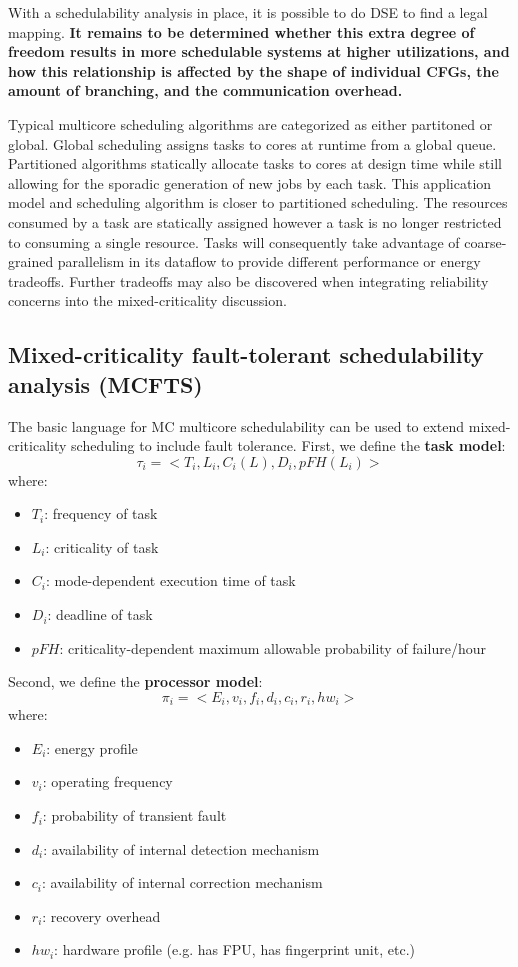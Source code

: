 \documentclass[table,11pt]{article}
\begin{document}
With a schedulability analysis in place, it is possible to do DSE to find a legal mapping. \textbf{It remains to be determined whether this extra degree of freedom results in more schedulable systems at higher utilizations, and how this relationship is affected by the shape of individual CFGs, the amount of branching, and the communication overhead.} 

Typical multicore scheduling algorithms are categorized as either partitoned or global. Global scheduling assigns tasks to cores at runtime from a global queue. Partitioned algorithms statically allocate tasks to cores at design time while still allowing for the sporadic generation of new jobs by each task. This application model and scheduling algorithm is closer to partitioned scheduling. The resources consumed by a task are statically assigned however a task is no longer restricted to consuming a single resource. Tasks will consequently take advantage of coarse-grained parallelism in its dataflow to provide different performance or energy tradeoffs. Further tradeoffs may also be discovered when integrating reliability concerns into the mixed-criticality discussion.

\subsection{Mixed-criticality fault-tolerant schedulability analysis (MCFTS)}
The basic language for MC multicore schedulability can be used to extend mixed-criticality scheduling to include fault tolerance. First, we define the \textbf{task model}:
\begin{equation}
\tau_i=<T_i,L_i,C_i(L),D_i,pFH(L_i)>
\end{equation}
where:
\begin{itemize}
  	\item $T_i$: frequency of task
	\item $L_i$: criticality of task
	\item $C_i$: mode-dependent execution time of task
	\item $D_i$: deadline of task
	\item $pFH$: criticality-dependent maximum allowable probability of failure/hour
\end{itemize}

Second, we define the \textbf{processor model}:
\begin{equation}
\pi_i = <E_i,v_i,f_i,d_i,c_i,r_i,hw_i>
\end{equation}
where: 
\begin{itemize}
  \item $E_i$: energy profile
  \item $v_i$: operating frequency
  \item $f_i$: probability of transient fault
  \item $d_i$: availability of internal detection mechanism
  \item $c_i$: availability of internal correction mechanism
  \item $r_i$: recovery overhead
  \item $hw_i$: hardware profile (e.g. has FPU, has fingerprint unit, etc.)
\end{itemize}
\end{document}
